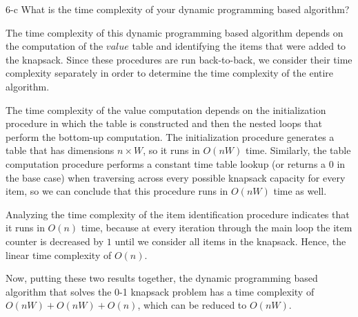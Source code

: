 \documentclass[11pt]{article}
\begin{document}
\begin{prob}{6-c}
What is the time complexity of your dynamic programming based algorithm?
\end{prob}
\begin{sol}
The time complexity of this dynamic programming based algorithm depends on the computation of the $value$ table and identifying the items that were added to the knapsack. Since these procedures are run back-to-back, we consider their time complexity separately in order to determine the time complexity of the entire algorithm.

The time complexity of the value computation depends on the initialization procedure in which the table is constructed and then the nested loops that perform the bottom-up computation. The initialization procedure generates a table that has dimensions $n \times W$, so it runs in $O(nW)$ time. Similarly, the table computation procedure performs a constant time table lookup (or returns a $0$ in the base case) when traversing across every possible knapsack capacity for every item, so we can conclude that this procedure runs in $O(nW)$ time as well.

Analyzing the time complexity of the item identification procedure indicates that it runs in $O(n)$ time, because at every iteration through the main loop the item counter is decreased by $1$ until we consider all items in the knapsack. Hence, the linear time complexity of $O(n)$.

Now, putting these two results together, the dynamic programming based algorithm that solves the 0-1 knapsack problem has a time complexity of $O(nW) + O(nW) + O(n)$, which can be reduced to $O(nW)$. 
\end{sol}
\end{document}
